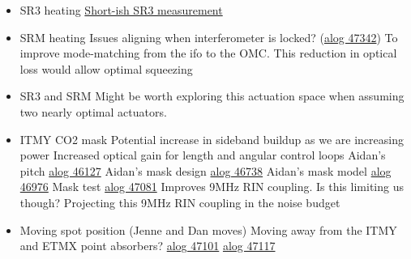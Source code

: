
\begin{itemize}
    \item SR3 heating
        \subitem \href{https://alog.ligo-wa.caltech.edu/aLOG/index.php?callRep=46540}{Short-ish SR3 measurement}
    \item SRM heating
    	\subitem Issues aligning when interferometer is locked? (\href{https://alog.ligo-wa.caltech.edu/aLOG/index.php?callRep=47342}{alog 47342})
        \subitem To improve mode-matching from the ifo to the OMC.
        \subitem This reduction in optical loss would allow optimal squeezing 
    \item SR3 and SRM 
    	\subitem Might be worth exploring this actuation space when assuming two nearly optimal actuators. 
    \item ITMY CO2 mask 
        \subitem Potential increase in sideband buildup as we are increasing power 
            \subsubitem Increased optical gain for length and angular control loops
        \subitem Aidan's pitch \href{https://alog.ligo-wa.caltech.edu/aLOG/index.php?callRep=46127}{alog 46127}
        \subitem Aidan's mask design \href{https://alog.ligo-wa.caltech.edu/aLOG/index.php?callRep=46738}{alog 46738}
        \subitem Aidan's mask model \href{https://alog.ligo-wa.caltech.edu/aLOG/index.php?callRep=46976}{alog 46976}
        \subitem Mask test \href{https://alog.ligo-wa.caltech.edu/aLOG/index.php?callRep=47081}{alog 47081}
            \subsubitem Improves 9MHz RIN coupling. Is this limiting us though?
            \subsubitem Projecting this 9MHz RIN coupling in the noise budget
                
    \item Moving spot position (Jenne and Dan moves)
    	\subitem Moving away from the ITMY and ETMX point absorbers?
        \href{https://alog.ligo-wa.caltech.edu/aLOG/index.php?callRep=47101}{alog 47101}
        \subsubitem
        \href{https://alog.ligo-wa.caltech.edu/aLOG/index.php?callRep=47117}{alog 47117}
        \subsubitem
        
\end{itemize}
